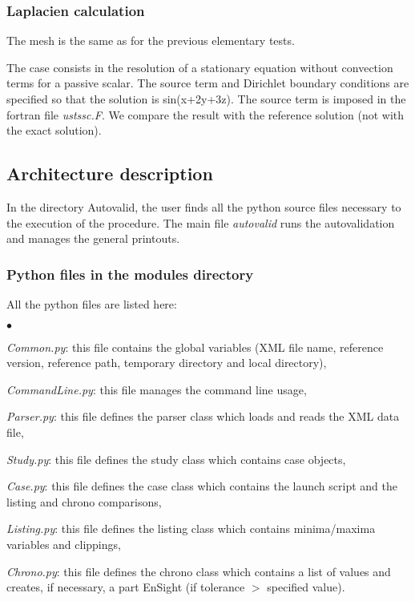 \subsubsection{Laplacien calculation}

The mesh is the same as for the previous elementary tests.

The case consists in the resolution of a stationary equation without
convection terms for a passive scalar. The source term and Dirichlet
boundary conditions are specified so that the solution is sin(x+2y+3z).
The source term is imposed in the fortran file {\it ustssc.F}.
We compare the result with the reference solution (not with the exact
solution).



\subsection{Architecture description}

In the directory Autovalid, the user finds all the python source
files necessary to the execution of the procedure. The main file
{\it autovalid} runs the autovalidation and manages the general
printouts.


\subsubsection{Python files in the modules directory}

All the python files are listed here:

\begin{list}{$\bullet$}{}
\item {\it Common.py}: this file contains the global variables (XML
      file name, reference version, reference path, temporary directory
      and local directory),
\item {\it CommandLine.py}: this file manages the command line usage,
\item {\it Parser.py}: this file defines the parser class which loads
      and reads the XML data file,
\item {\it Study.py}: this file defines the study class which contains
      case objects,
\item {\it Case.py}: this file defines the case class which contains
      the launch script and the listing and chrono comparisons,
\item {\it Listing.py}: this file defines the listing class which
      contains minima/maxima variables and clippings,
\item {\it Chrono.py}: this file defines the chrono class which
      contains a list of values and creates, if necessary, a part
      EnSight (if tolerance $>$ specified value).
\end{list}


